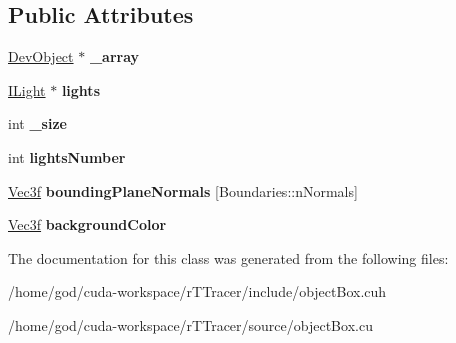 \subsection*{Public Attributes}
\begin{DoxyCompactItemize}
\item 
\hyperlink{class_dev_object}{Dev\+Object} $\ast$ {\bfseries \+\_\+array}\hypertarget{class_object_box_a1c5db29dce3ca086d225788ac6f5b1b9}{}\label{class_object_box_a1c5db29dce3ca086d225788ac6f5b1b9}

\item 
\hyperlink{class_i_light}{I\+Light} $\ast$ {\bfseries lights}\hypertarget{class_object_box_a4c242111384906aafc355ab98b148076}{}\label{class_object_box_a4c242111384906aafc355ab98b148076}

\item 
int {\bfseries \+\_\+size}\hypertarget{class_object_box_a5b8723c68c6d742bc04c601122612615}{}\label{class_object_box_a5b8723c68c6d742bc04c601122612615}

\item 
int {\bfseries lights\+Number}\hypertarget{class_object_box_add9c5ed5d73451037155bd85d53be522}{}\label{class_object_box_add9c5ed5d73451037155bd85d53be522}

\item 
\hyperlink{class_vec3}{Vec3f} {\bfseries bounding\+Plane\+Normals} \mbox{[}Boundaries\+::n\+Normals\mbox{]}\hypertarget{class_object_box_a082f8c59cead7723d2afd470b2376c6a}{}\label{class_object_box_a082f8c59cead7723d2afd470b2376c6a}

\item 
\hyperlink{class_vec3}{Vec3f} {\bfseries background\+Color}\hypertarget{class_object_box_a5e71a6c5ca56daf46ddf570730433f16}{}\label{class_object_box_a5e71a6c5ca56daf46ddf570730433f16}

\end{DoxyCompactItemize}


The documentation for this class was generated from the following files\+:\begin{DoxyCompactItemize}
\item 
/home/god/cuda-\/workspace/r\+T\+Tracer/include/object\+Box.\+cuh\item 
/home/god/cuda-\/workspace/r\+T\+Tracer/source/object\+Box.\+cu\end{DoxyCompactItemize}
